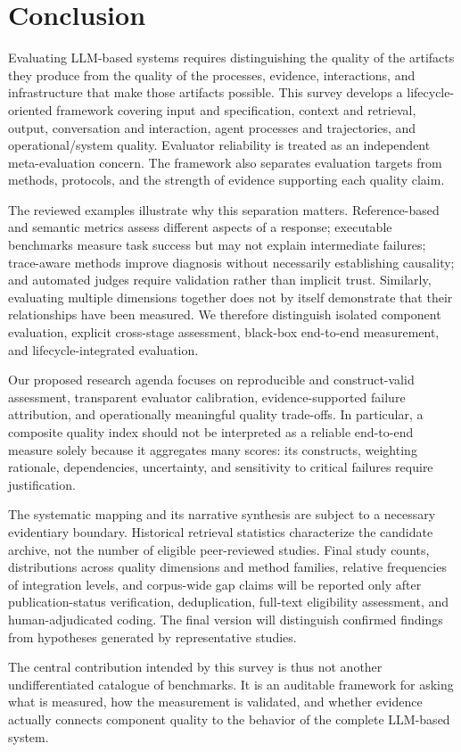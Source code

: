 \section{Conclusion}
\label{sec:conclusion}

Evaluating LLM-based systems requires distinguishing the quality of the artifacts they produce from the quality of the processes, evidence, interactions, and infrastructure that make those artifacts possible. This survey develops a lifecycle-oriented framework covering input and specification, context and retrieval, output, conversation and interaction, agent processes and trajectories, and operational/system quality. Evaluator reliability is treated as an independent meta-evaluation concern. The framework also separates evaluation targets from methods, protocols, and the strength of evidence supporting each quality claim.

The reviewed examples illustrate why this separation matters. Reference-based and semantic metrics assess different aspects of a response; executable benchmarks measure task success but may not explain intermediate failures; trace-aware methods improve diagnosis without necessarily establishing causality; and automated judges require validation rather than implicit trust. Similarly, evaluating multiple dimensions together does not by itself demonstrate that their relationships have been measured. We therefore distinguish isolated component evaluation, explicit cross-stage assessment, black-box end-to-end measurement, and lifecycle-integrated evaluation.

Our proposed research agenda focuses on reproducible and construct-valid assessment, transparent evaluator calibration, evidence-supported failure attribution, and operationally meaningful quality trade-offs. In particular, a composite quality index should not be interpreted as a reliable end-to-end measure solely because it aggregates many scores: its constructs, weighting rationale, dependencies, uncertainty, and sensitivity to critical failures require justification.

The systematic mapping and its narrative synthesis are subject to a necessary evidentiary boundary. Historical retrieval statistics characterize the candidate archive, not the number of eligible peer-reviewed studies. Final study counts, distributions across quality dimensions and method families, relative frequencies of integration levels, and corpus-wide gap claims will be reported only after publication-status verification, deduplication, full-text eligibility assessment, and human-adjudicated coding. The final version will distinguish confirmed findings from hypotheses generated by representative studies.

The central contribution intended by this survey is thus not another undifferentiated catalogue of benchmarks. It is an auditable framework for asking what is measured, how the measurement is validated, and whether evidence actually connects component quality to the behavior of the complete LLM-based system.
